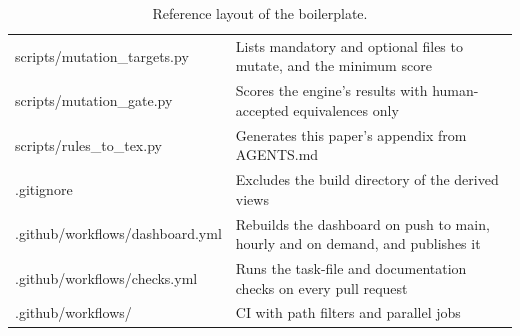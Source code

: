 \documentclass[11pt,a4paper]{article}
\begin{document}
\begin{table}[H]
\begin{tabularx}{\textwidth}{@{}>{\footnotesize\ttfamily\raggedright\arraybackslash}p{6.9cm}>{\raggedright\arraybackslash}X@{}}
scripts/mutation\_targets.py & Lists mandatory and optional files to mutate, and the minimum score\\
scripts/mutation\_gate.py & Scores the engine's results with human-accepted equivalences only\\
scripts/rules\_to\_tex.py & Generates this paper's appendix from AGENTS.md\\
.gitignore & Excludes the build directory of the derived views\\
.github/workflows/dashboard.yml & Rebuilds the dashboard on push to main, hourly and on demand, and publishes it\\
.github/workflows/checks.yml & Runs the task-file and documentation checks on every pull request\\
.github/workflows/ & CI with path filters and parallel jobs\\
\bottomrule
\end{tabularx}
\caption{Reference layout of the boilerplate.}
\label{tab:layout}
\end{table}
\end{document}
